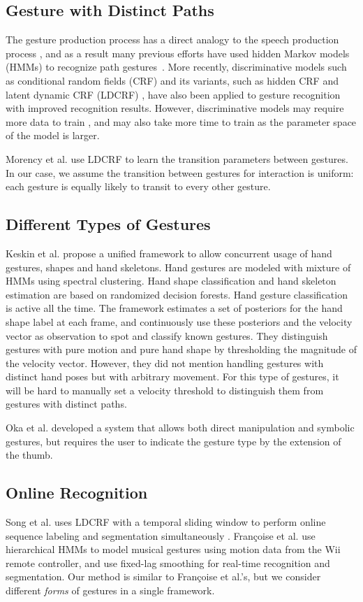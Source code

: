 \documentclass[conference]{IEEEtran}
\begin{document}
\subsection{Gesture with Distinct Paths}
The gesture production process has a direct analogy to the
speech production process \cite{Kettebekov01}, and as a result many previous
efforts have used hidden Markov models (HMMs) to recognize path gestures~\cite{Starner95, sharma00}. More recently, discriminative models such as
conditional random fields (CRF) and its variants, such as hidden CRF
\cite{wang06} and latent dynamic CRF (LDCRF) \cite{morency07}, have also been
applied to gesture recognition with improved recognition results.
However, discriminative models may require more data to train \cite{ng02},
and may also take more time to train as the parameter space of the model is
larger.

Morency et al. \cite{morency07} use LDCRF to learn the transition parameters
between gestures. In our case, we assume the transition between gestures for
interaction is uniform: each gesture is equally likely to transit to every
other gesture.

\subsection{Different Types of Gestures}
Keskin et al. \cite{keskin12} propose a unified framework to allow concurrent
usage of hand gestures, shapes and hand skeletons. Hand gestures are modeled
with mixture of HMMs using spectral clustering. Hand shape classification and
hand skeleton estimation are based on randomized decision forests. Hand
gesture classification is active all the time. The framework estimates a set of
posteriors for the hand shape label at each frame, and continuously use these
posteriors and the velocity vector as observation to spot and classify known
gestures. They distinguish gestures with pure motion and pure hand shape by
thresholding the magnitude of the velocity vector. However, they did not mention
handling gestures with distinct hand poses but with arbitrary movement. For this
type of gestures, it will be hard to manually set a velocity threshold to
distinguish them from gestures with distinct paths.

Oka et al. \cite{Oka02} developed a system that
allows both direct manipulation and symbolic gestures, but requires the user to
indicate the gesture type by the extension of the thumb.

\subsection{Online Recognition}
Song et al. uses LDCRF with a temporal sliding window to perform
online sequence labeling and segmentation simultaneously \cite{song12}. 
Fran{\c{c}}oise et al. \cite{francoise11} use hierarchical HMMs to model musical
gestures using motion data from the Wii remote controller, and use fixed-lag
smoothing for real-time recognition and segmentation.
Our method is similar to Fran{\c{c}}oise et al.'s, but we consider different
\textit{forms} of gestures in a single framework.
\end{document}
